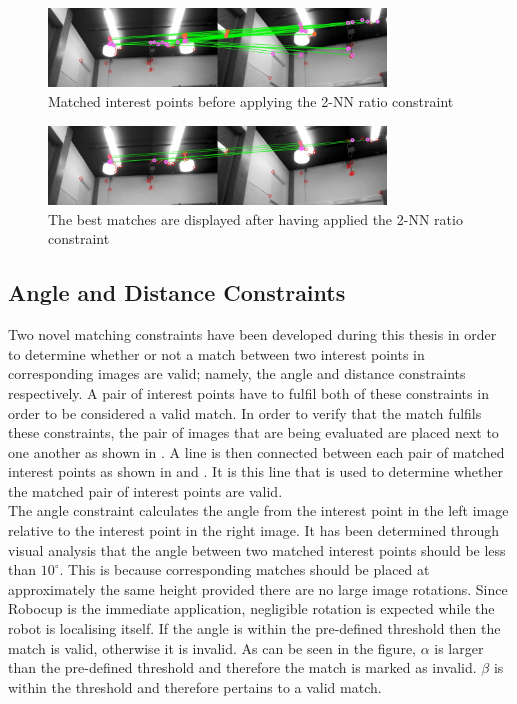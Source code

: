 \begin{figure}[h!] 
  \centering
    \includegraphics[width=0.8\textwidth]{../Drawings/Matching/feature_matching/dataset_2nn_matching_constraint_before.jpg}
    \caption{Matched interest points before applying the 2-NN ratio constraint}
    \label{fig:2nn_1}
\end{figure}

\begin{figure}[h!] 
  \centering
    \includegraphics[width=0.8\textwidth]{../Drawings/Matching/feature_matching/dataset_2nn_matching_constraint_after.jpg}
    \caption{The best matches are displayed after having applied the 2-NN ratio constraint}
    \label{fig:2nn_2}
\end{figure}


\subsection{Angle and Distance Constraints}
\label{sec:angleDistanceConstraints}
Two novel matching constraints have been developed during this thesis in order to determine whether or not a match between two interest points in corresponding images are valid; namely, the angle and distance constraints respectively. A pair of interest points have to fulfil both of these constraints in order to be considered a valid match. In order to verify that the match fulfils these constraints, the pair of images that are being evaluated are placed next to one another as shown in . A line is then connected between each pair of matched interest points as shown in  and . It is this line that is used to determine whether the matched pair of interest points are valid.\\

The angle constraint calculates the angle from the interest point in the left image relative to the interest point in the right image. It has been determined through visual analysis that the angle between two matched interest points should be less than  $10^{\circ}$. This is because corresponding matches should be placed at approximately the same height provided there are no large image rotations. Since Robocup is the immediate application, negligible rotation is expected while the robot is localising itself. If the angle is within the pre-defined threshold then the match is valid, otherwise it is invalid. As can be seen in the figure, $\alpha$ is larger than the pre-defined threshold and therefore the match is marked as invalid. $\beta$ is within the threshold and therefore pertains to a valid match. \\

